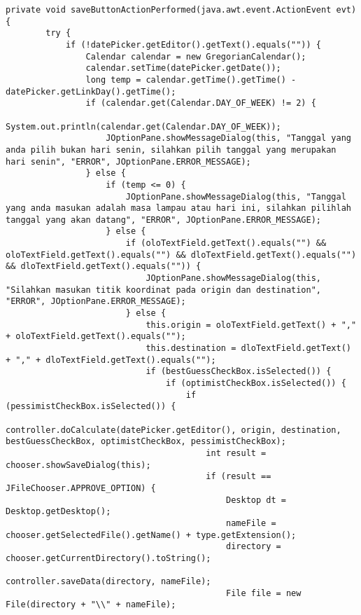 \begin{lstlisting}[caption= main.java]
    private void saveButtonActionPerformed(java.awt.event.ActionEvent evt) {                                           
        try {
            if (!datePicker.getEditor().getText().equals("")) {
                Calendar calendar = new GregorianCalendar();
                calendar.setTime(datePicker.getDate());
                long temp = calendar.getTime().getTime() - datePicker.getLinkDay().getTime();
                if (calendar.get(Calendar.DAY_OF_WEEK) != 2) {
                    System.out.println(calendar.get(Calendar.DAY_OF_WEEK));
                    JOptionPane.showMessageDialog(this, "Tanggal yang anda pilih bukan hari senin, silahkan pilih tanggal yang merupakan hari senin", "ERROR", JOptionPane.ERROR_MESSAGE);
                } else {
                    if (temp <= 0) {
                        JOptionPane.showMessageDialog(this, "Tanggal yang anda masukan adalah masa lampau atau hari ini, silahkan pilihlah tanggal yang akan datang", "ERROR", JOptionPane.ERROR_MESSAGE);
                    } else {
                        if (oloTextField.getText().equals("") && oloTextField.getText().equals("") && dloTextField.getText().equals("") && dloTextField.getText().equals("")) {
                            JOptionPane.showMessageDialog(this, "Silahkan masukan titik koordinat pada origin dan destination", "ERROR", JOptionPane.ERROR_MESSAGE);
                        } else {
                            this.origin = oloTextField.getText() + "," + oloTextField.getText().equals("");
                            this.destination = dloTextField.getText() + "," + dloTextField.getText().equals("");
                            if (bestGuessCheckBox.isSelected()) {
                                if (optimistCheckBox.isSelected()) {
                                    if (pessimistCheckBox.isSelected()) {
                                        controller.doCalculate(datePicker.getEditor(), origin, destination, bestGuessCheckBox, optimistCheckBox, pessimistCheckBox);
                                        int result = chooser.showSaveDialog(this);
                                        if (result == JFileChooser.APPROVE_OPTION) {
                                            Desktop dt = Desktop.getDesktop();
                                            nameFile = chooser.getSelectedFile().getName() + type.getExtension();
                                            directory = chooser.getCurrentDirectory().toString();
                                            controller.saveData(directory, nameFile);
                                            File file = new File(directory + "\\" + nameFile);

\end{lstlisting}
